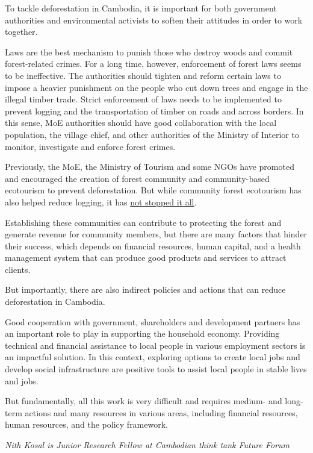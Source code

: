 \documentclass[10pt,a4paper]{letter}
\begin{document}
To tackle deforestation in Cambodia, it is important for both government authorities and environmental activists to soften their attitudes in order to work together.

Laws are the best mechanism to punish those who destroy woods and commit forest-related crimes. For a long time, however, enforcement of forest laws seems to be ineffective. The authorities should tighten and reform certain laws to impose a heavier punishment on the people who cut down trees and engage in the illegal timber trade. Strict enforcement of laws needs to be implemented to prevent logging and the transportation of timber on roads and across borders. In this sense, MoE authorities should have good collaboration with the local population, the village chief, and other authorities of the Ministry of Interior to monitor, investigate and enforce forest crimes.

Previously, the MoE, the Ministry of Tourism and some NGOs have promoted and encouraged the creation of forest community and community-based ecotourism to prevent deforestation. But while community forest ecotourism has also helped reduce logging, it has \href{https://link.springer.com/chapter/10.1007%2F978-981-15-8632-3_9}{not stopped it all}. 

Establishing these communities can contribute to protecting the forest and generate revenue for community members, but there are many factors that hinder their success, which depends on financial resources, human capital, and a health management system that can produce good products and services to attract clients.

But importantly, there are also indirect policies and actions that can reduce deforestation in Cambodia. 

Good cooperation with government, shareholders and development partners has an important role to play in supporting the household economy. Providing technical and financial assistance to local people in various employment sectors is an impactful solution. In this context, exploring options to create local jobs and develop social infrastructure are positive tools to assist local people in stable lives and jobs.
 
But fundamentally, all this work is very difficult and requires medium- and long-term actions and many resources in various areas, including financial resources, human resources, and the policy framework.

\textit{Nith Kosal is Junior Research Fellow at Cambodian think tank Future Forum}
\end{document}

